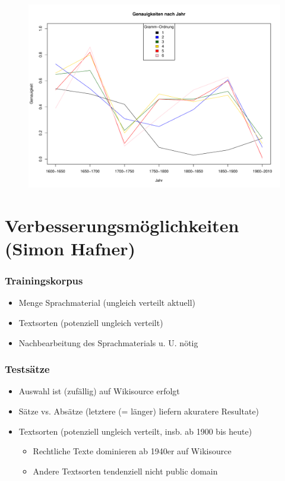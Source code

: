 \documentclass[t]{beamer} %
\begin{document}
\begin{frame}
  \begin{figure}[ht]
    \includegraphics[width=1\textwidth]{Gramm}
  \end{figure}
\end{frame}

\section{Verbesserungsmöglichkeiten (Simon Hafner)}
\begin{frame}
  \frametitle{Trainingskorpus}
  \begin{itemize}
  \item Menge Sprachmaterial (ungleich verteilt aktuell)\pause
  \item Textsorten (potenziell ungleich verteilt)\pause
  \item Nachbearbeitung des Sprachmaterials u. U. nötig\pause
  \end{itemize}  
\end{frame}

\begin{frame}
  \frametitle{Testsätze}
  \begin{itemize}
  \item Auswahl ist (zufällig) auf Wikisource erfolgt\pause
  \vspace*{1ex}
  \item Sätze vs. Absätze (letztere (= länger) liefern akuratere Resultate)\pause
  \item Textsorten (potenziell ungleich verteilt, insb. ab 1900 bis heute)\pause
  \begin{itemize}
   \item Rechtliche Texte dominieren ab 1940er auf Wikisource
   \item Andere Textsorten tendenziell nicht public domain
  \end{itemize}
  \end{itemize}  
\end{frame}
\end{document}
